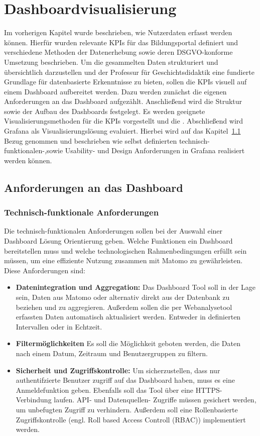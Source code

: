 \chapter{Dashboardvisualisierung} %
\label{ch:auswahl}
Im vorherigen Kapitel wurde beschrieben, wie Nutzerdaten erfasst werden können. Hierfür wurden relevante KPIs für das Bildungsportal definiert und verschiedene Methoden der Datenerhebung sowie deren DSGVO-konforme Umsetzung beschrieben. Um die gesammelten Daten strukturiert und übersichtlich darzustellen und der Professur für Geschichtsdidaktik eine fundierte Grundlage für datenbasierte Erkenntnisse zu bieten, sollen die KPIs visuell auf einem Dashboard aufbereitet werden. Dazu werden zunächst die eigenen Anforderungen an das Dashboard aufgezählt. Anschließend wird die Struktur sowie der Aufbau des Dashboards festgelegt. Es werden geeignete Visualisierungsmethoden für die KPIs vorgestellt und die . Abschließend wird Grafana als Visualisierungslösung evaluiert. Hierbei wird auf das Kapitel~\ref{sec:anforderungen} Bezug genommen und beschrieben wie selbst definierten technisch-funktionalen-,sowie Usability- und Design Anforderungen in Grafana realisiert werden können. 

\section{Anforderungen an das Dashboard}
\label{sec:anforderungen}
\subsection{Technisch-funktionale Anforderungen}
Die technisch-funktionalen Anforderungen sollen bei der Auswahl einer Dashboard Lösung Orientierung geben. Welche Funktionen ein Dashboard bereitstellen muss und welche technologischen Rahmenbedingungen erfüllt sein müssen, um eine effiziente Nutzung zusammen mit Matomo zu gewährleisten. Diese Anforderungen sind: 
\begin{itemize}
    \item \textbf{Datenintegration und Aggregation:} Das Dashboard Tool soll in der Lage sein, Daten aus Matomo oder alternativ direkt aus der Datenbank zu beziehen und zu aggregieren. Außerdem sollen die per Webanalysetool erfassten Daten automatisch aktualisiert werden. Entweder in definierten Intervallen oder in Echtzeit.
    \item \textbf{Filtermöglichkeiten} Es soll die Möglichkeit geboten werden, die Daten nach einem Datum, Zeitraum und Benutzergruppen zu filtern.
    \item \textbf{Sicherheit und Zugriffskontrolle:} Um sicherzustellen, dass nur authentifzierte Benutzer zugriff auf das Dashboard haben, muss es eine Anmeldefunktion geben. Ebenfalls soll das Tool über eine HTTPS-Verbindung laufen. API- und Datenquellen- Zugriffe müssen gesichert werden, um unbefugten Zugriff zu verhindern. Außerdem soll eine Rollenbasierte Zugriffskontrolle (engl. Roll based Access Controll (RBAC)) implementiert werden.
\end{itemize}

